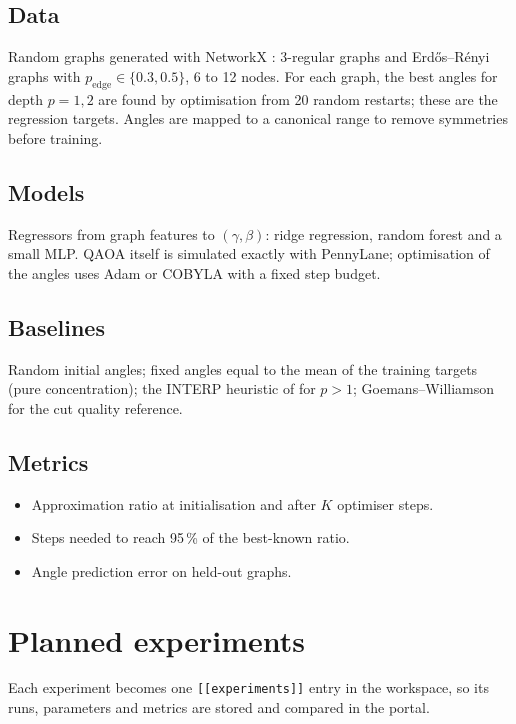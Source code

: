 \documentclass[11pt,a4paper]{article}
\begin{document}
\subsection{Data}
Random graphs generated with NetworkX \citep{hagberg2008}: 3-regular graphs and Erd\H{o}s--R\'enyi
graphs with $p_{\text{edge}}\in\{0.3,0.5\}$, 6 to 12 nodes. For each graph, the best angles for depth
$p=1,2$ are found by optimisation from 20 random restarts; these are the regression targets. Angles
are mapped to a canonical range to remove symmetries before training.

\subsection{Models}
Regressors from graph features to $(\gamma,\beta)$: ridge regression, random forest and a small MLP.
QAOA itself is simulated exactly with PennyLane; optimisation of the angles uses Adam or COBYLA with a
fixed step budget.

\subsection{Baselines}
Random initial angles; fixed angles equal to the mean of the training targets (pure concentration);
the INTERP heuristic of \citet{zhou2020} for $p>1$; Goemans--Williamson for the cut quality reference.

\subsection{Metrics}
\begin{itemize}
  \item Approximation ratio at initialisation and after $K$ optimiser steps.
  \item Steps needed to reach 95\,\% of the best-known ratio.
  \item Angle prediction error on held-out graphs.
\end{itemize}

\section{Planned experiments}
Each experiment becomes one \texttt{[[experiments]]} entry in the workspace, so its runs, parameters
and metrics are stored and compared in the portal.
\end{document}
